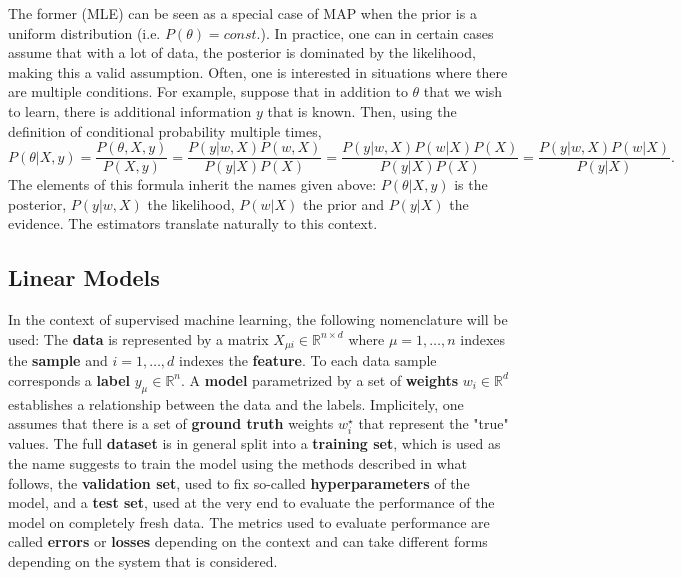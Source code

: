 \documentclass{article}
\begin{document}
The former (MLE) can be seen as a special case of MAP when the prior is a uniform distribution (i.e. $P(\theta) = const.$). In practice, one can in certain cases assume that with a lot of data, the posterior is dominated by the likelihood, making this a valid assumption.
\restoregeometry
\noindent Often, one is interested in situations where there are multiple conditions. For example, suppose that in addition to $\theta$ that we wish to learn, there is additional information $y$ that is known. Then, using the definition of conditional probability multiple times,
\begin{equation}
    P(\theta | X,y) = \frac{P(\theta,X,y)}{P(X,y)}
    =
    \frac{P(y|w,X)P(w,X)}{P(y|X)P(X)}
    =
    \frac{P(y|w,X)P(w|X)P(X)}{P(y|X)P(X)}
    =
    \frac{P(y|w,X)P(w|X)}{P(y|X)}.
    \label{eq:posterior}
\end{equation}
The elements of this formula inherit the names given above: $P(\theta | X,y)$ is the posterior, $P(y|w,X)$ the likelihood, $P(w|X)$ the prior and $P(y|X)$ the evidence. The estimators translate naturally to this context.
\subsection{Linear Models}
In the context of supervised machine learning, the following nomenclature will be used:
The \textbf{data} is represented by a matrix $X_{\mu i} \in \mathbb{R}^{n \times d}$ where $\mu = 1,\dots,n$ indexes the \textbf{sample} and $i = 1,\dots,d$ indexes the \textbf{feature}. To each data sample corresponds a \textbf{label} $y_{\mu} \in \mathbb{R}^n$. A \textbf{model} parametrized by a set of \textbf{weights} $w_i \in \mathbb{R}^d$ establishes a relationship between the data and the labels. Implicitely, one assumes that there is a set of \textbf{ground truth} weights $w_i^{\star}$ that represent the "true" values. The full \textbf{dataset} is in general split into a \textbf{training set}, which is used as the name suggests to train the model using the methods described in what follows, the \textbf{validation set}, used to fix so-called \textbf{hyperparameters} of the model, and a \textbf{test set}, used at the very end to evaluate the performance of the model on completely fresh data. The metrics used to evaluate performance are called \textbf{errors} or \textbf{losses} depending on the context and can take different forms depending on the system that is considered.
\end{document}
